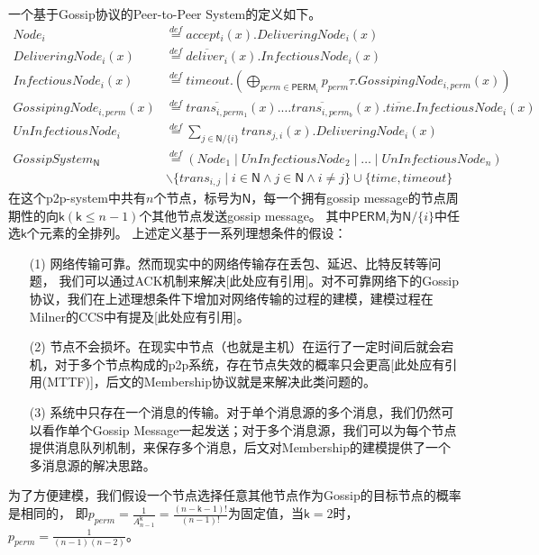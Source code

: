 一个基于Gossip协议的Peer-to-Peer System的定义如下。
\begin{align*}
   Node_i& \stackrel{def}{=} accept_i(x).DeliveringNode_i(x)\\
   DeliveringNode_i(x) &\stackrel{def}{=} \overline{deliver_i}(x).InfectiousNode_i(x)\\
   InfectiousNode_i(x)&\stackrel{def}{=}timeout.(\bigoplus_{perm\in \mathsf{PERM}_i} p_{perm}\tau.GossipingNode_{i,perm}(x))\\
   GossipingNode_{i,perm}(x)&\stackrel{def}{=}\overline{trans_{i,perm_{1}}}(x).\dots \overline{trans_{i,perm_{b}}}(x).\overline{time}.InfectiousNode_i(x)\\
   UnInfectiousNode_i &\stackrel{def}{=} \sum_{j\in \mathsf{N}/\{i\}}trans_{j,i}(x).DeliveringNode_i(x)\\
   GossipSystem_\mathsf{N}&\stackrel{def}{=}(Node_1\mid UnInfectiousNode_2\mid \dots \mid UnInfectiousNode_n)\\
   &\backslash \{trans_{i,j}\mid i\in \mathsf{N} \wedge j\in \mathsf{N} \wedge i\neq j\}\cup \{time, timeout\}
\end{align*}
在这个p2p-system中共有$n$个节点，标号为$\mathsf{N}$，每一个拥有gossip message的节点周期性的向$\mathsf{k}(\mathsf{k}\leq n-1)$个其他节点发送gossip message。
其中$\mathsf{PERM}_i$为$\mathsf{N}/\{i\}$中任选$\mathsf{k}$个元素的全排列。
上述定义基于一系列理想条件的假设：
\begin{itemize}
   \item [(1)] {网络传输可靠。然而现实中的网络传输存在丢包、延迟、比特反转等问题，
   我们可以通过ACK机制来解决[此处应有引用]。对不可靠网络下的Gossip协议，我们在上述理想条件下增加对网络传输的过程的建模，建模过程在Milner的CCS中有提及[此处应有引用]。}
   \item [(2)] {节点不会损坏。在现实中节点（也就是主机）在运行了一定时间后就会宕机，对于多个节点构成的p2p系统，存在节点失效的概率只会更高[此处应有引用(MTTF)]，后文的Membership协议就是来解决此类问题的。}
   \item [(3)] {系统中只存在一个消息的传输。对于单个消息源的多个消息，我们仍然可以看作单个Gossip Message一起发送；对于多个消息源，我们可以为每个节点提供消息队列机制，来保存多个消息，后文对Membership的建模提供了一个多消息源的解决思路。}
\end{itemize}

为了方便建模，我们假设一个节点选择任意其他节点作为Gossip的目标节点的概率是相同的，
即$p_{perm} = \frac{1}{A_{n-1}^{\mathsf{k}}} = \frac{(n-\mathsf{k}-1)!}{(n-1)!}$为固定值，当$\mathsf{k}=2$时，$p_{perm} = \frac{1}{(n-1)(n-2)}$。

